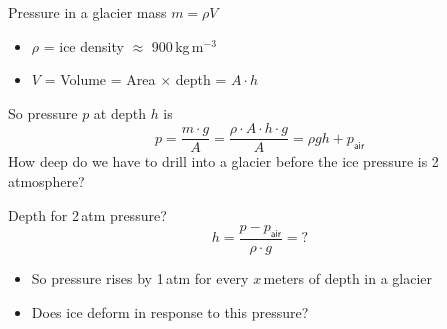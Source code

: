 \documentclass[hide notes,intlimits,unknownkeysallowed]{beamer}
\begin{document}

\begin{frame}{Pressure in a glacier}
  mass $m = \rho V$
     \begin{itemize}
      \item $\rho$ = ice density $\approx$ 900\,kg\,m$^{-3}$
      \item$V$ = Volume = Area $\times$ depth = $A \cdot h$
     \end{itemize}
     So pressure $p$ at depth $h$ is
     \begin{displaymath}
       p = \frac{m \cdot g}{A} = \frac{\rho \cdot A \cdot h \cdot g}{A} = \rho g h + p_{\textsf{air}}
     \end{displaymath}
     How deep do we have to drill into a glacier before the ice pressure is 2 atmosphere?
\end{frame}


\begin{frame}{Depth for 2\,atm pressure?}
    \begin{displaymath}
       h = \frac{p-p_{\textsf{air}}}{\rho\cdot g} = ?
     \end{displaymath}
     \begin{itemize}
     \item  So pressure rises by 1\,atm for every \alert{$x$}\,meters of depth in a glacier
     \item Does ice deform in response to this pressure?
     \end{itemize}
\end{frame}
\end{document}
